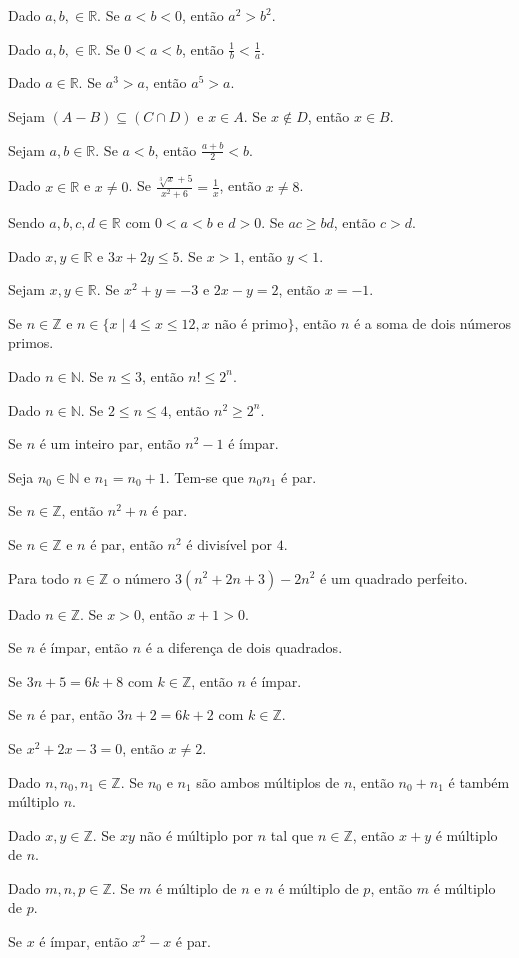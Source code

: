 \begin{exerList}
	\item Dado $a, b, \in \mathbb{R}$. Se $a < b < 0$, então $a^2 > b^2$.
	\item Dado $a, b, \in \mathbb{R}$. Se $0 < a < b$, então $\frac{1}{b} < \frac{1}{a}$.
	\item Dado $a \in \mathbb{R}$. Se $a^3 > a$, então $a^5 > a$.
	\item Sejam $(A - B) \subseteq (C \cap D)$ e $x \in A$. Se $x \notin D$, então $x \in B$.
	\item Sejam $a, b \in \mathbb{R}$. Se $a < b$, então $\frac{a + b}{2} < b$.
	\item Dado $x \in \mathbb{R}$ e $x \neq 0$. Se $\frac{\sqrt[3]{x} + 5}{x^2 + 6} = \frac{1}{x}$, então $x \neq 8$.
	\item Sendo $a, b, c, d \in \mathbb{R}$ com $0 < a < b$ e $d > 0$. Se $ac \geq bd$, então $c > d$.
	\item Dado $x, y \in \mathbb{R}$ e $3x + 2y \leq 5$. Se $x > 1$, então $y < 1$.
	\item Sejam $x, y \in \mathbb{R}$. Se $x^2 + y = -3$ e $2x - y = 2$, então $x = -1$.
  \item Se $n \in \mathbb{Z}$ e $n \in \{x \mid 4 \leq x \leq 12, x \text{ não é primo}\}$, então $n$ é a soma de dois números primos.
	\item Dado $n \in \mathbb{N}$. Se $n \leq 3$, então $n! \leq 2^n$.
	\item Dado $n \in \mathbb{N}$. Se $2 \leq n \leq 4$, então $n^2 \geq 2^n$. 
	\item Se $n$ é um inteiro par, então $n^2 - 1$ é ímpar.
	\item Seja $n_0 \in \mathbb{N}$ e $n_1 = n_0 + 1$. Tem-se que $n_0n_1$ é par.
	\item Se $n \in \mathbb{Z}$, então $n^2 + n$ é par.
	\item Se $n \in \mathbb{Z}$ e $n$ é par, então $n^2$ é divisível por $4$. 
	\item Para todo $n \in \mathbb{Z}$ o número $3(n^2 + 2n + 3) - 2n^2$ é um quadrado perfeito.
	\item Dado $n \in \mathbb{Z}$. Se $x > 0$, então $x + 1 > 0$.
	\item Se $n$ é ímpar, então $n$ é a diferença de dois quadrados.
	\item Se $3n + 5 = 6k + 8$ com $k \in \mathbb{Z}$, então $n$ é ímpar.
	\item Se $n$ é par, então $3n + 2 = 6k + 2$ com $k \in \mathbb{Z}$.
	\item Se $x^2 + 2x - 3 = 0$, então $x \neq 2$.
	\item Dado $n, n_0, n_1 \in \mathbb{Z}$. Se $n_0$ e $n_1$ são ambos múltiplos de $n$, então $n_0 + n_1$ é também múltiplo $n$.
	\item Dado $x, y \in \mathbb{Z}$. Se $xy$ não é múltiplo por $n$ tal que $n \in \mathbb{Z}$, então $x + y$ é múltiplo de $n$.
  \item Dado $m, n, p \in \mathbb{Z}$. Se $m$ é múltiplo de $n$ e $n$ é múltiplo de $p$, então $m$ é múltiplo de $p$.
	\item Se $x$ é ímpar, então $x^2 - x$ é par.
\end{exerList}

